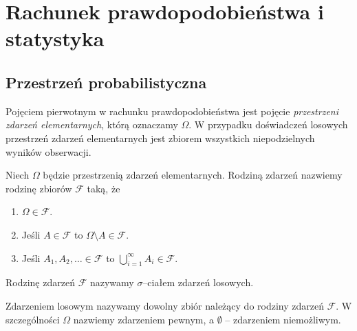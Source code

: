 \documentclass{myclass}
\numberwithin{equation}{subsection}
\begin{document}
\section{Rachunek prawdopodobieństwa i statystyka}


\subsection{Przestrzeń probabilistyczna}

Pojęciem pierwotnym w rachunku prawdopodobieństwa jest pojęcie \emph{przestrzeni zdarzeń
elementarnych}, którą oznaczamy \(\Omega\). W przypadku doświadczeń losowych przestrzeń zdarzeń
elementarnych jest zbiorem wszystkich niepodzielnych wyników obserwacji.

\begin{definition}

Niech \(\Omega\) będzie przestrzenią zdarzeń elementarnych. Rodziną zdarzeń nazwiemy rodzinę zbiorów
\(\mathcal{F}\) taką, że
\begin{enumerate}
    
    \item \(\Omega \in \mathcal{F}\).
    
    \item Jeśli \(A \in \mathcal{F}\) to \(\Omega \setminus A \in \mathcal{F}\).
    
    \item Jeśli \(A_1,A_2,\ldots \in \mathcal{F}\) to \(\bigcup_{i=1}^\infty A_i \in \mathcal{F}\).

\end{enumerate}

Rodzinę zdarzeń \(\mathcal{F}\) nazywamy \(\sigma\)--ciałem zdarzeń losowych.

\end{definition}

\begin{definition}
    Zdarzeniem losowym nazywamy dowolny zbiór należący do rodziny zdarzeń \(\mathcal{F}\). W
    szczególności \(\Omega\) nazwiemy zdarzeniem pewnym, a \(\emptyset\) -- zdarzeniem niemożliwym.
\end{definition}
\end{document}
